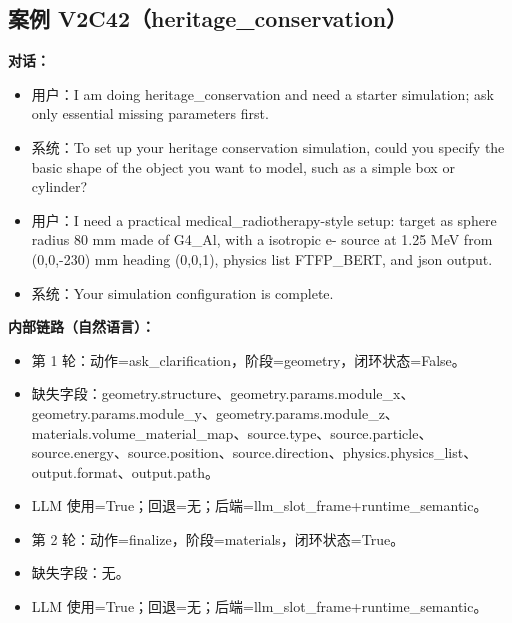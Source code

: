 \documentclass[11pt]{ctexart}
\begin{document}
\subsection{案例 V2C42（heritage\_conservation）}
\textbf{对话：}
\begin{itemize}
\item 用户：I am doing heritage\_conservation and need a starter simulation; ask only essential missing parameters first.
\item 系统：To set up your heritage conservation simulation, could you specify the basic shape of the object you want to model, such as a simple box or cylinder?
\item 用户：I need a practical medical\_radiotherapy-style setup: target as sphere radius 80 mm made of G4\_Al, with a isotropic e- source at 1.25 MeV from (0,0,-230) mm heading (0,0,1), physics list FTFP\_BERT, and json output.
\item 系统：Your simulation configuration is complete.
\end{itemize}
\textbf{内部链路（自然语言）：}
\begin{itemize}
\item 第 1 轮：动作=ask\_clarification，阶段=geometry，闭环状态=False。
\item 缺失字段：geometry.structure、geometry.params.module\_x、geometry.params.module\_y、geometry.params.module\_z、materials.volume\_material\_map、source.type、source.particle、source.energy、source.position、source.direction、physics.physics\_list、output.format、output.path。
\item LLM 使用=True；回退=无；后端=llm\_slot\_frame+runtime\_semantic。
\item 第 2 轮：动作=finalize，阶段=materials，闭环状态=True。
\item 缺失字段：无。
\item LLM 使用=True；回退=无；后端=llm\_slot\_frame+runtime\_semantic。
\end{itemize}
\end{document}
